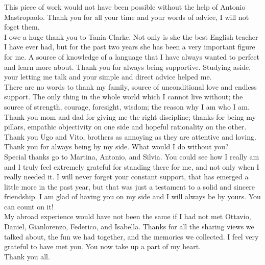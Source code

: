 \begin{acknowledgements}
This piece of work would not have been possible without the help of Antonio Mastropaolo. 
Thank you for all your time and your words of advice, I will not foget them.\\
\newline
I owe a huge thank you to Tania Clarke. Not only is she the best English teacher I have ever had, 
but for the past two years she has been a very important figure for me. A source of knowledge
of a language that I have always wanted to perfect and learn more about. Thank you for always being supportive.
Studying aside, your letting me talk and your simple and direct advice helped me.\\
\newline
There are no words to thank my family, source of unconditional love and endless support. 
The only thing in the whole world which I cannot live without;
the source of strength, courage, foresight, wisdom; the reason why I am who I am.
Thank you mom and dad for giving me the right discipline; thanks for being my pillars, 
empathic objectivity on one side and hopeful rationality on the other. Thank you Ugo and Vito, 
brothers as annoying as they are attentive and loving. Thank you for always being by my side. What would I do without you?\\
\newline
Special thanks go to Martina, Antonio, and Silvia. 
You could see how I really am and I truly feel extremely grateful 
for standing there for me, and not only when I really needed it. 
I will never forget your constant support, that has emerged a little more in the past year, but that was 
just a testament to a solid and sincere friendship. I am glad of having you on my side and I will always be by yours.
You can count on it!\\
\newline
My abroad experience would have not been the same if I had not met Ottavio, Daniel, Gianlorenzo, Federico, and Isabella. 
Thanks for all the sharing views we talked about, the fun we had together, and the memories we collected. I feel very grateful to have met you.
You now take up a part of my heart.\\
\newline
Thank you all.
\end{acknowledgements}